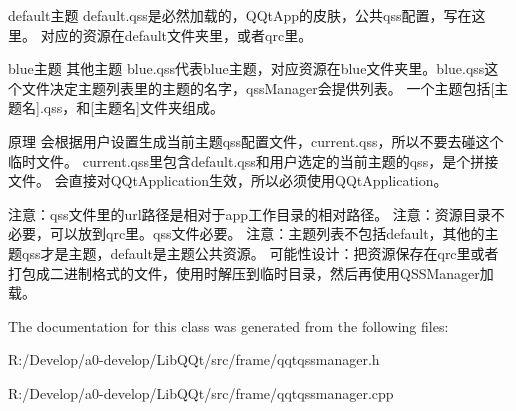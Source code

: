 default主题 default.\+qss是必然加载的，\+Q\+Qt\+App的皮肤，公共qss配置，写在这里。 对应的资源在default文件夹里，或者qrc里。

blue主题 其他主题 blue.\+qss代表blue主题，对应资源在blue文件夹里。blue.\+qss这个文件决定主题列表里的主题的名字，qss\+Manager会提供列表。 一个主题包括\mbox{[}主题名\mbox{]}.qss，和\mbox{[}主题名\mbox{]}文件夹组成。

原理 会根据用户设置生成当前主题qss配置文件，current.\+qss，所以不要去碰这个临时文件。 current.\+qss里包含default.\+qss和用户选定的当前主题的qss，是个拼接文件。 会直接对\+Q\+Qt\+Application生效，所以必须使用\+Q\+Qt\+Application。

注意：qss文件里的url路径是相对于app工作目录的相对路径。 注意：资源目录不必要，可以放到qrc里。qss文件必要。 注意：主题列表不包括default，其他的主题qss才是主题，default是主题公共资源。 可能性设计：把资源保存在qrc里或者打包成二进制格式的文件，使用时解压到临时目录，然后再使用\+Q\+S\+S\+Manager加载。 

The documentation for this class was generated from the following files\+:\begin{DoxyCompactItemize}
\item 
R\+:/\+Develop/a0-\/develop/\+Lib\+Q\+Qt/src/frame/qqtqssmanager.\+h\item 
R\+:/\+Develop/a0-\/develop/\+Lib\+Q\+Qt/src/frame/qqtqssmanager.\+cpp\end{DoxyCompactItemize}
